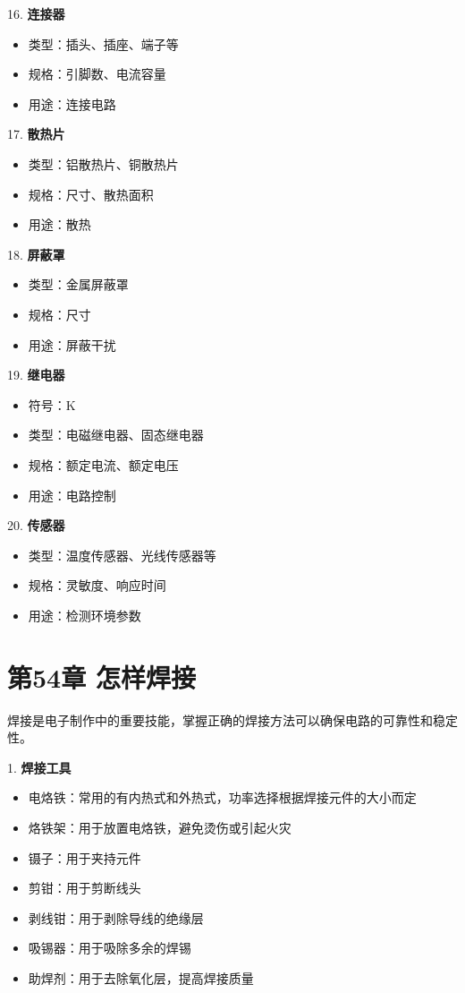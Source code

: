 \documentclass[12pt,UTF8]{ctexbook}
\begin{document}
16. \textbf{连接器}
    \begin{itemize}[leftmargin=3.5em]
    \item 类型：插头、插座、端子等
    \item 规格：引脚数、电流容量
    \item 用途：连接电路
    \end{itemize}

17. \textbf{散热片}
    \begin{itemize}[leftmargin=3.5em]
    \item 类型：铝散热片、铜散热片
    \item 规格：尺寸、散热面积
    \item 用途：散热
    \end{itemize}

18. \textbf{屏蔽罩}
    \begin{itemize}[leftmargin=3.5em]
    \item 类型：金属屏蔽罩
    \item 规格：尺寸
    \item 用途：屏蔽干扰
    \end{itemize}

19. \textbf{继电器}
    \begin{itemize}[leftmargin=3.5em]
    \item 符号：K
    \item 类型：电磁继电器、固态继电器
    \item 规格：额定电流、额定电压
    \item 用途：电路控制
    \end{itemize}

20. \textbf{传感器}
    \begin{itemize}[leftmargin=3.5em]
    \item 类型：温度传感器、光线传感器等
    \item 规格：灵敏度、响应时间
    \item 用途：检测环境参数
    \end{itemize}

\chapter*{第54章 怎样焊接}

焊接是电子制作中的重要技能，掌握正确的焊接方法可以确保电路的可靠性和稳定性。

1. \textbf{焊接工具}
   \begin{itemize}[leftmargin=3.5em]
   \item 电烙铁：常用的有内热式和外热式，功率选择根据焊接元件的大小而定
   \item 烙铁架：用于放置电烙铁，避免烫伤或引起火灾
   \item 镊子：用于夹持元件
   \item 剪钳：用于剪断线头
   \item 剥线钳：用于剥除导线的绝缘层
   \item 吸锡器：用于吸除多余的焊锡
   \item 助焊剂：用于去除氧化层，提高焊接质量
   \end{itemize}
\end{document}
